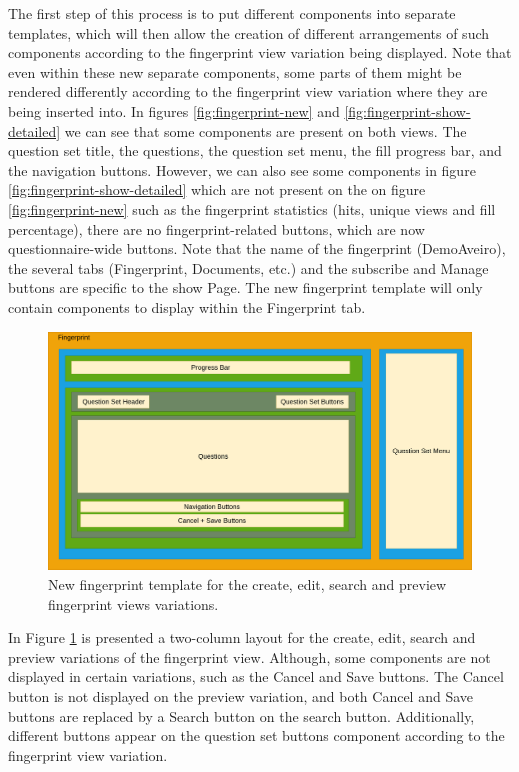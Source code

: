The first step of this process is to put different components into separate templates, which will then allow the creation of different arrangements of such components according to the fingerprint view variation being displayed.
Note that even within these new separate components, some parts of them might be rendered differently according to the fingerprint view variation where they are being inserted into.
In figures \ref{fig:fingerprint-new} and \ref{fig:fingerprint-show-detailed} we can see that some components are present on both views.
The question set title, the questions, the question set menu, the fill progress bar, and the navigation buttons.
However, we can also see some components in figure \ref{fig:fingerprint-show-detailed} which are not present on the on figure \ref{fig:fingerprint-new} such as the fingerprint statistics (hits, unique views and fill percentage), there are no fingerprint-related buttons, which are now questionnaire-wide buttons.
Note that the name of the fingerprint (DemoAveiro), the several tabs (Fingerprint, Documents, etc.) and the subscribe and Manage buttons are specific to the show Page.
The new fingerprint template will only contain components to display within the Fingerprint tab.

\begin{figure}
    \center
    \includegraphics[width=\textwidth]{fingerprint-other-after-diagram}
    \caption{New fingerprint template for the create, edit, search and preview fingerprint views variations.}
    \label{fig:fingerprint-other-after-diagram}
\end{figure}

In Figure \ref{fig:fingerprint-other-after-diagram} is presented a two-column layout for the create, edit, search and preview variations of the fingerprint view.
Although, some components are not displayed in certain variations, such as the Cancel and Save buttons.
The Cancel button is not displayed on the preview variation, and both Cancel and Save buttons are replaced by a Search button on the search button.
Additionally, different buttons appear on the question set buttons component according to the fingerprint view variation.

